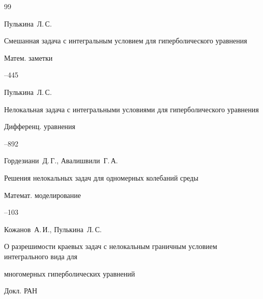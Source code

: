 







\begin{thebibliography}{99}







\by Пулькина~Л.\,С.


\paper Смешанная задача с интегральным условием для гиперболического уравнения


\jour Матем. заметки








--445







\by Пулькина~Л.\,С.


\paper Нелокальная задача с интегральными условиями для гиперболического уравнения


\jour Дифференц. уравнения








--892







\by Гордезиани~Д.\,Г., Авалишвили~Г.\,А.


\paper Решения нелокальных задач для одномерных колебаний среды


\jour Математ. моделирование








--103







\by Кожанов~А.\,И., Пулькина~Л.\,С.


\paper О разрешимости краевых задач с нелокальным граничным условием интегрального вида для


многомерных гиперболических уравнений


\jour Докл. РАН







\end{thebibliography}
